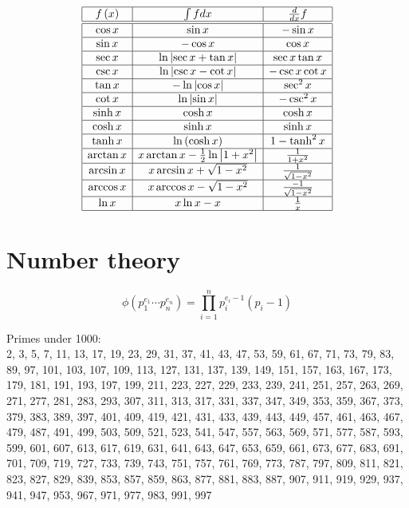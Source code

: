 \[\begin{array}{|c|c|c|}
\hline
f\left(x\right) & \int f dx & \frac{d}{dx}f\\\hline \hline
\cos x & \sin x & -\sin x\\\hline
\sin x & -\cos x & \cos x\\\hline
\sec x & \ln\left|\sec x + \tan x\right| & \sec x \tan x\\\hline
\csc x & \ln\left|\csc x - \cot x\right| & -\csc x \cot x\\\hline
\tan x& -\ln\left|\cos x\right| & \sec^2 x\\\hline
\cot x & \ln\left|\sin x\right| & -\csc^2 x\\\hline
\sinh x & \cosh x & \cosh x\\\hline
\cosh x & \sinh x & \sinh x\\\hline
\tanh x & \ln \left(\cosh x\right) & 1-\tanh^2 x\\\hline
\arctan x & x \arctan x - \frac{1}{2} \ln \left|1+x^2\right| & \frac{1}{1+x^2}\\\hline
\arcsin x & x \arcsin x + \sqrt{1-x^2}& \frac{1}{\sqrt{1-x^2}}\\\hline
\arccos x & x \arccos x - \sqrt{1-x^2}& \frac{-1}{\sqrt{1-x^2}}\\\hline
\ln x & x\ln x - x & \frac{1}{x}\\\hline
\end{array}
\]


\section{Number theory}

\[\phi\left(p_1^{e_1}\cdots p_n^{e_n}\right)=\prod_{i=1}^{n}p_i^{e_i-1}\left(p_i-1\right)\]


Primes under 1000:\\
2, 3, 5, 7, 11, 13, 17, 19, 23, 29, 31, 37, 41, 43, 47, 53, 59, 61, 67, 71, 73, 79, 83, 89, 97, 101, 103, 107, 109, 113, 127, 131, 137, 139, 149, 151, 157, 163, 167, 173, 179, 181, 191, 193, 197, 199, 211, 223, 227, 229, 233, 239, 241, 251, 257, 263, 269, 271, 277, 281, 283, 293, 307, 311, 313, 317, 331, 337, 347, 349, 353, 359, 367, 373, 379, 383, 389, 397, 401, 409, 419, 421, 431, 433, 439, 443, 449, 457, 461, 463, 467, 479, 487, 491, 499, 503, 509, 521, 523, 541, 547, 557, 563, 569, 571, 577, 587, 593, 599, 601, 607, 613, 617, 619, 631, 641, 643, 647, 653, 659, 661, 673, 677, 683, 691, 701, 709, 719, 727, 733, 739, 743, 751, 757, 761, 769, 773, 787, 797, 809, 811, 821, 823, 827, 829, 839, 853, 857, 859, 863, 877, 881, 883, 887, 907, 911, 919, 929, 937, 941, 947, 953, 967, 971, 977, 983, 991, 997


